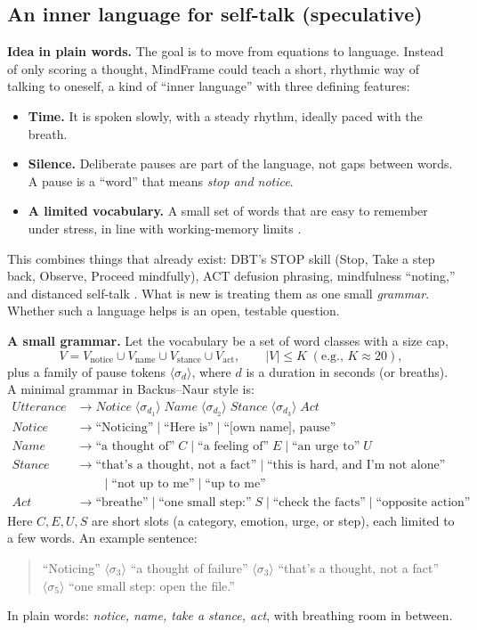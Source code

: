 \documentclass[11pt]{article}
\newcommand{\pause}[1]{\langle\sigma_{#1}\rangle}
\begin{document}
\subsection{An inner language for self-talk (speculative)}\label{sec:il}
\textbf{Idea in plain words.} The goal is to move from equations to language. Instead of only scoring a thought, MindFrame could teach a short, rhythmic way of talking to oneself, a kind of ``inner language'' with three defining features:
\begin{itemize}
\item \textbf{Time.} It is spoken slowly, with a steady rhythm, ideally paced with the breath.
\item \textbf{Silence.} Deliberate pauses are part of the language, not gaps between words. A pause is a ``word'' that means \emph{stop and notice}.
\item \textbf{A limited vocabulary.} A small set of words that are easy to remember under stress, in line with working-memory limits \citep{cowan2001}.
\end{itemize}
This combines things that already exist: DBT's STOP skill (Stop, Take a step back, Observe, Proceed mindfully), ACT defusion phrasing, mindfulness ``noting,'' and distanced self-talk \citep{kross2014}. What is new is treating them as one small \emph{grammar}. Whether such a language helps is an open, testable question.

\textbf{A small grammar.} Let the vocabulary be a set of word classes with a size cap,
\[
V = V_{\text{notice}} \cup V_{\text{name}} \cup V_{\text{stance}} \cup V_{\text{act}}, \qquad |V| \le K \;(\text{e.g., } K\approx 20),
\]
plus a family of pause tokens $\pause{d}$, where $d$ is a duration in seconds (or breaths). A minimal grammar in Backus--Naur style is:
\begin{align*}
\textit{Utterance} &\to \textit{Notice}\;\pause{d_1}\;\textit{Name}\;\pause{d_2}\;\textit{Stance}\;\pause{d_3}\;\textit{Act}\\
\textit{Notice} &\to \text{``Noticing''} \mid \text{``Here is''} \mid \text{``[own name], pause''}\\
\textit{Name} &\to \text{``a thought of''}\;C \mid \text{``a feeling of''}\;E \mid \text{``an urge to''}\;U\\
\textit{Stance} &\to \text{``that's a thought, not a fact''} \mid \text{``this is hard, and I'm not alone''}\\ &\qquad \mid \text{``not up to me''} \mid \text{``up to me''}\\
\textit{Act} &\to \text{``breathe''} \mid \text{``one small step:''}\;S \mid \text{``check the facts''} \mid \text{``opposite action''}
\end{align*}
Here $C, E, U, S$ are short slots (a category, emotion, urge, or step), each limited to a few words. An example sentence:
\begin{quote}\small
``Noticing'' $\pause{3}$ ``a thought of failure'' $\pause{3}$ ``that's a thought, not a fact'' $\pause{5}$ ``one small step: open the file.''
\end{quote}
In plain words: \emph{notice, name, take a stance, act}, with breathing room in between.
\end{document}
